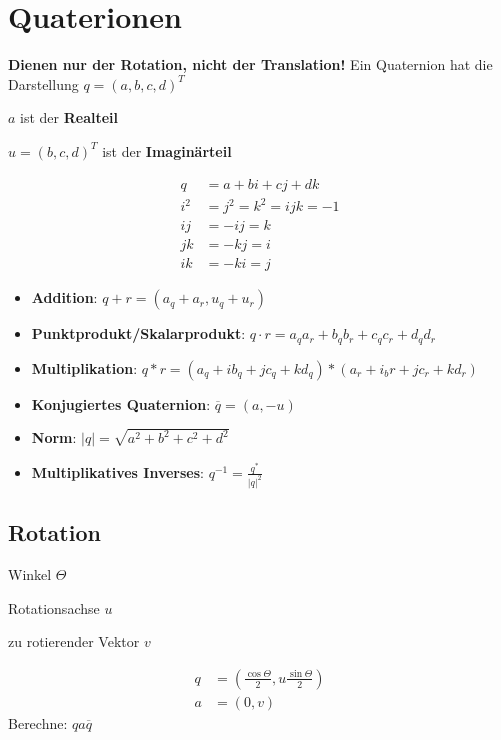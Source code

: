 \section{Quaterionen}
\textbf{Dienen nur der Rotation, nicht der Translation!}
Ein Quaternion hat die Darstellung $q = (a,b,c,d)^T$
\begin{compactitem}
    \item $a$ ist der \textbf{Realteil}
    \item $u = (b,c,d)^T$ ist der \textbf{Imaginärteil}
\end{compactitem}
\begin{align}
    q &= a + bi + cj + dk \\
    i^2 &= j^2 = k^2 = ijk = -1 \\
    ij &= -ij = k \\
    jk &= -kj = i \\
    ik &= -ki = j
\end{align}
\begin{itemize}
    \item \textbf{Addition}: $q + r = (a_q + a_r, u_q + u_r)$
    \item \textbf{Punktprodukt/Skalarprodukt}: $q \cdot r = a_qa_r +b_qb_r + c_qc_r + d_qd_r $
    \item \textbf{Multiplikation}: $q * r = (a_q + ib_q + jc_q + kd_q) * (a_r + i_br + jc_r + kd_r)$
    \item \textbf{Konjugiertes Quaternion}: $\overline{q} = (a,-u)$
    \item \textbf{Norm}: $|q| = \sqrt{a^2+b^2+c^2+d^2}$
    \item \textbf{Multiplikatives Inverses}: $q^{-1} = \frac{q^*}{|q|^2}$
\end{itemize}

\subsection{Rotation}
\begin{compactitem}
    \item Winkel $\Theta$
    \item Rotationsachse $u$
    \item zu rotierender Vektor $v$
\end{compactitem}
\begin{align}
    q &= (\frac{\cos\Theta}{2},u\frac{\sin\Theta}{2})\\
    a &= (0,v)
\end{align}
Berechne: $qa\overline{q}$
